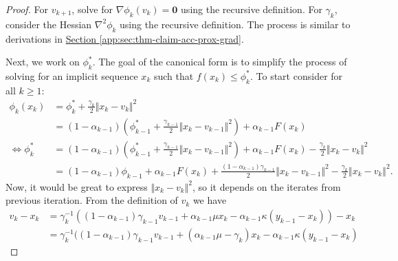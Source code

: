 \documentclass[12pt]{article}
\begin{document}
        \begin{proof}
            For $v_{k + 1}$, solve for $\nabla \phi_k(v_k) = \mathbf 0$ using the recursive definition. 
            For $\gamma_k$, consider the Hessian $\nabla^2 \phi_k$ using the recursive definition. 
            The process is similar to derivations in 
            \hyperref[app:sec:thm-claim-acc-prox-grad]{Section \ref*{app:sec:thm-claim-acc-prox-grad}}. 

            Next, we work on $\phi_k^*$. 
            The goal of the canonical form is to simplify the process of solving for an implicit sequence $x_k$ such that $f(x_k) \le \phi_k^*$. 
            To start consider for all $k \ge 1$: 
            \begin{align*}
                \phi_k(x_k) &= 
                \phi_k^* + \frac{\gamma_k}{2}\Vert x_k - v_k\Vert^2
                \\
                & = (1 - \alpha_{k - 1})\left(
                    \phi_{k - 1}^* + \frac{\gamma_{k - 1}}{2}\Vert x_k - v_{k - 1}\Vert^2
                \right) + \alpha_{k - 1}F(x_k)
                \\
                \iff 
                \phi_k^* &= 
                (1 - \alpha_{k - 1})\left(
                    \phi_{k - 1}^* + \frac{\gamma_{k - 1}}{2}\Vert x_k - v_{k - 1}\Vert^2
                \right) + \alpha_{k - 1}F(x_k) - \frac{\gamma_k}{2}\Vert x_k - v_k\Vert^2
                \\
                &= 
                (1 - \alpha_{k - 1})\phi_{k - 1}+ \alpha_{k - 1}F(x_k)
                + 
                \frac{(1 - \alpha_{k - 1})\gamma_{k - 1}}{2}\Vert x_k - v_{k - 1}\Vert^2
                - \frac{\gamma_k}{2}\Vert x_k - v_k\Vert^2.
            \end{align*}
                Now, it would be great to express $\Vert x_k - v_k\Vert^2$, so it depends on the iterates from previous iteration. 
                From the definition of $v_k$ we have 
            \begin{align*}
                v_k - x_k &= 
                \gamma_k^{-1}(
                (
                    1 - \alpha_{k - 1})\gamma_{k - 1}v_{k - 1}
                    + \alpha_{k - 1}\mu x_k - \alpha_{k - 1}\kappa(y_{k - 1} - x_k)
                ) - x_k
                \\
                &= 
                \gamma_k^{-1}(
                    (1 - \alpha_{k - 1})\gamma_{k - 1}v_{k - 1}
                    + (\alpha_{k - 1}\mu - \gamma_k) x_k - \alpha_{k - 1}\kappa(y_{k - 1} - x_k)

\end{align*}
\end{proof}
\end{document}
